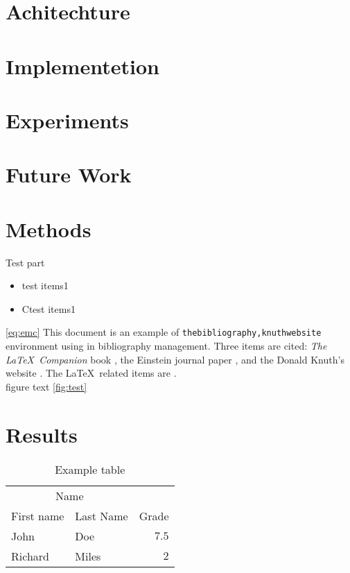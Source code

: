 \documentclass[twoside,twocolumn]{article}
\begin{document}
\subsection{}

\section{Achitechture}

\section{Implementetion}

\section{Experiments}

\section{Future Work}

\section{Methods}

Test part 
\begin{itemize}
\item test items1
\item Ctest items1
\end{itemize}
\blindtext %

\ref{eq:emc} This document is an example of \texttt{thebibliography,knuthwebsite} environment using 
in bibliography management. Three items are cited: \textit{The \LaTeX\ Companion} 
book \cite{latexcompanion}, the Einstein journal paper \cite{einstein}, and the 
Donald Knuth's website \cite{knuthwebsite}. The \LaTeX\ related items are
\cite{latexcompanion,knuthwebsite}. 
\\ figure text \ref{fig:test} 


\section{Results}

\begin{table}
\caption{Example table}
\centering
\begin{tabular}{llr}
\toprule
\multicolumn{2}{c}{Name} \\
\cmidrule(r){1-2}
First name & Last Name & Grade \\
\midrule
John & Doe & $7.5$ \\
Richard & Miles & $2$ \\
\bottomrule
\end{tabular}
\end{table}
\end{document}
